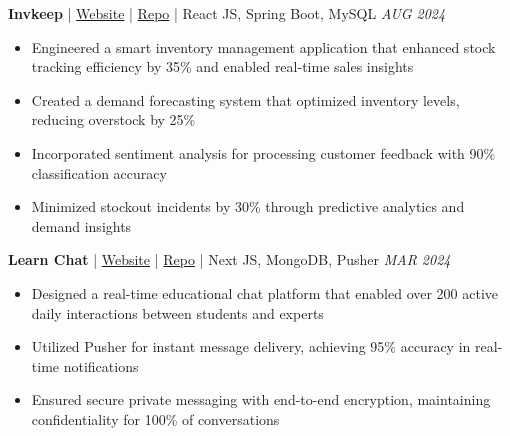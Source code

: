 \documentclass[10pt, letterpaper]{article}
\newenvironment{resumePoints}{
    \begin{itemize}[leftmargin=*,nosep,noitemsep,topsep=2pt,parsep=0pt]
}{\end{itemize}}
\begin{document}
\vspace{0.15cm}

\textbf{Invkeep} | \href{https://invkeep.vercel.app/}{Website} | \href{https://github.com/vignesh2004vasu/INVKEEP}{Repo} | React JS, Spring Boot, MySQL \hfill \textit{AUG 2024}
\begin{resumePoints}
    \item Engineered a smart inventory management application that enhanced stock tracking efficiency by 35\% and enabled real-time sales insights
    \item Created a demand forecasting system that optimized inventory levels, reducing overstock by 25\%
    \item Incorporated sentiment analysis for processing customer feedback with 90\% classification accuracy
    \item Minimized stockout incidents by 30\% through predictive analytics and demand insights
\end{resumePoints}


\vspace{0.15cm}

\textbf{Learn Chat} | \href{https://learnchat.vercel.app/}{Website} | \href{https://github.com/vignesh2004vasu/studychat}{Repo} | Next JS, MongoDB, Pusher \hfill \textit{MAR 2024}
\begin{resumePoints}
    \item Designed a real-time educational chat platform that enabled over 200 active daily interactions between students and experts
    \item Utilized Pusher for instant message delivery, achieving 95\% accuracy in real-time notifications
    \item Ensured secure private messaging with end-to-end encryption, maintaining confidentiality for 100\% of conversations
\end{resumePoints}


\end{document}
